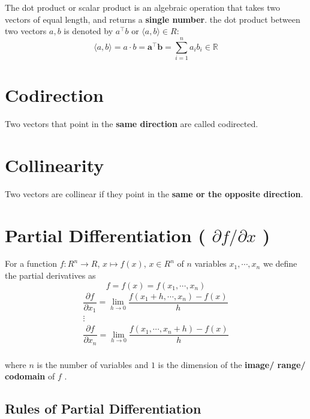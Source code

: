 The dot product or scalar product is an algebraic operation that takes two vectors of equal length, and returns a \textbf{single number}.
the dot product between two vectors $a, b$ is denoted by $a^\top b$ or $\langle a, b\rangle \in R$:
\[
    \displaystyle
    \langle a, b \rangle =
    a\cdot b = 
    \mathbf{a^\top b} =
    \sum_{i=1}^{n} a_i b_i
    \in \mathbb{R}
\]


\section{Codirection}\label{Codirection}
Two vectors that point in the \textbf{same direction} are called codirected. 


\section{Collinearity}\label{Collinearity}
Two vectors are collinear if they point in the \textbf{same or the opposite direction}.


\section{Partial Differentiation ( $\partial f/\partial x$ )} \label{vectors: Partial Differentiation}

For a function $f : R^n \to R$, $x \mapsto f(x)$, $x \in R^n$ of $n$ variables $x_1, \cdots , x_n$ we define the partial derivatives as
\[
    f = f(x) = f(x_1, \cdots , x_n)
\]
\[
    \displaystyle
    \begin{matrix}
    \dfrac{\partial f}{\partial x_1} = 
    \lim_{h\to 0} \dfrac{f(x_1+h, \cdots , x_n) - f(x)}{h} \\
    \vdots\\
    \dfrac{\partial f}{\partial x_n} = 
    \lim_{h\to 0} \dfrac{f(x_1, \cdots , x_n+h) - f(x)}{h} \\
    \end{matrix}
\]

where $n$ is the number of variables and $1$ is the dimension of the \textbf{image/ range/ codomain} of $f$ .


\subsection{Rules of Partial Differentiation}


